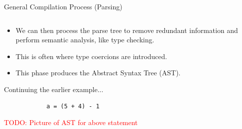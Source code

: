 \documentclass{beamer}
\newcommand{\todo}[1]{\textcolor{red}{TODO: #1}}
\begin{document}
\begin{frame}[fragile]{General Compilation Process (Parsing)}
\begin{columns}[T,onlytextwidth]
        \begin{overprint}
            \begin{itemize}
                \item We can then process the parse tree to remove redundant information and perform semantic analysis, like type checking.
                \item This is often where type coercions are introduced.
                \item This phase produces the Abstract Syntax Tree (AST).
            \end{itemize}

            Continuing the earlier example...
            \begin{lstlisting}
            a = (5 + 4) - 1
            \end{lstlisting}

            \todo{Picture of AST for above statement}
        \end{overprint}

\end{columns}
\end{frame}
\end{document}
